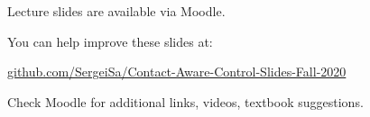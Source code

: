 \documentclass{beamer}
\begin{document}
\begin{frame}
\centerline{Lecture slides are available via Moodle.}
\bigskip
\centerline{You can help improve these slides at:}
\centerline{\href{https://github.com/SergeiSa/Contact-Aware-Control-Slides-Fall-2020}{github.com/SergeiSa/Contact-Aware-Control-Slides-Fall-2020}}
\bigskip
\centerline{Check Moodle for additional links, videos, textbook suggestions.}
\end{frame}
\end{document}
